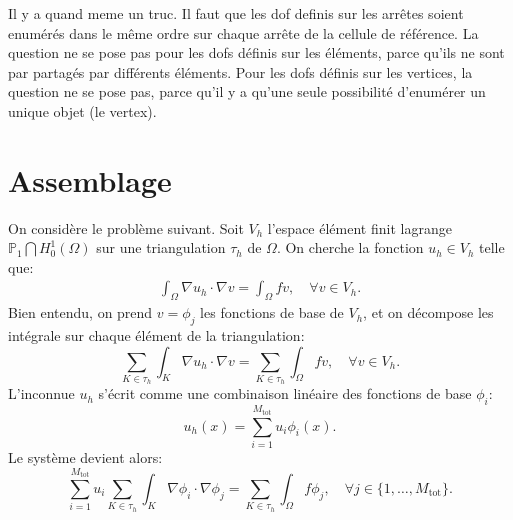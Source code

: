 Il y a quand meme un truc. Il faut que les dof definis sur les
arr\^etes soient enum\'er\'es dans le m\^eme ordre sur chaque arr\^ete de
la cellule de r\'ef\'erence. La question ne se pose pas pour les dofs
d\'efinis sur les \'el\'ements, parce qu'ils ne sont par partag\'es par
diff\'erents \'el\'ements. Pour les dofs d\'efinis sur les vertices, la
question ne se pose pas, parce qu'il y a qu'une seule possibilit\'e
d'enum\'erer un unique objet (le vertex). 

\section{Assemblage}
On consid\`ere le probl\`eme suivant. Soit $V_h$ l'espace \'el\'ement finit lagrange $\mathbb P_1\bigcap H^1_0(\Omega)$ sur une triangulation $\tau_h$ de $\Omega$. On cherche la fonction $u_h\in V_h$ telle que:
\begin{align}
  \int_\Omega \nabla u_h\cdot \nabla v = \int_\Omega f v,\quad \forall v \in V_h.
\end{align}
Bien entendu, on prend $v = \phi_j$ les fonctions de base de $V_h$, et on d\'ecompose les int\'egrale sur chaque \'el\'ement de la triangulation:
\begin{equation}
  \sum_{K\in\tau_h}\int_K \nabla u_h\cdot \nabla v = \sum_{K \in \tau_h}\int_\Omega f v, \quad \forall v \in V_h.
\end{equation}
L'inconnue $u_h$ s'\'ecrit comme une combinaison lin\'eaire des fonctions de base $\phi_i$:
\begin{equation}
  u_h(x) = \sum_{i = 1}^{M_\text{tot}} u_i \phi_i(x).
\end{equation}
Le syst\`eme devient alors:
\begin{equation}
  \sum_{i = 1}^{M_\text{tot}}u_i\sum_{K\in\tau_h}\int_K \nabla \phi_i\cdot \nabla \phi_j = \sum_{K \in \tau_h}\int_\Omega f \phi_j, \quad \forall j \in \{1, \dots,M_\text{tot}\}.
\end{equation}

